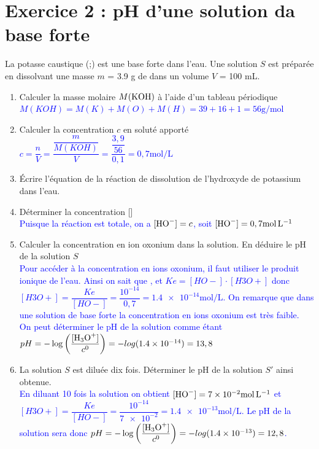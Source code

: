 \documentclass[a4paper,12pt]{article}
\begin{document}
\section*{Exercice 2 : pH d'une solution da base forte}
La potasse caustique (;) est une base forte dans l'eau. Une solution $S$ est préparée en dissolvant une masse $m$ = \num{3,9} \unit{\gram} de  dans un volume $V$ = \num{100} \unit{\milli \liter}.
\begin{enumerate}
	\item Calculer la masse molaire $M(\ce{KOH})$ à l'aide d'un tableau périodique\\
	\textcolor{blue}{$M(KOH) = M(K)+M(O)+M(H)=39+16+1=56\unit{\gram\per\mole}$}
	\item Calculer la concentration $c$ en soluté apporté\\
	\textcolor{blue}{$c=\dfrac{n}{V} = \dfrac{\dfrac{m}{M(KOH)}}{V} = \dfrac{\dfrac{3,9}{56}}{0,1} =0,7\unit{\mole\per\liter}$}
	\item Écrire l'équation de la réaction de dissolution de l'hydroxyde de potassium  dans l'eau.\\
	\textcolor{blue}{}
	\item Déterminer la concentration []\\
	\textcolor{blue}{Puisque la réaction est totale, on a $[\ce{HO-}]=c$, soit $[\ce{HO-}]=0,7\unit{\mole\per\liter}$}
	\item Calculer la concentration en ion oxonium dans la solution. En déduire le pH de la solution $S$\\
	\textcolor{blue}{Pour accéder à la concentration en ions oxonium, il faut utiliser le produit ionique de l'eau. Ainsi on sait que , et $Ke =[HO-]\cdot [H3O+]$ donc $[H3O+] = \dfrac{Ke}{[HO-]} = \dfrac{10^{-14}}{0,7}=\num{1,4e-14}\unit{\mole\per\liter}$. On remarque que dans une solution de base forte la concentration en ions oxonium est très faible.}\\
	\textcolor{blue}{On peut déterminer le pH de la solution comme étant $pH=-\log\left(\dfrac{[\ce{H3O+}]}{c^0}\right) = -log(\num{1,4e-14})=13,8$}
	\item La solution $S$ est diluée dix fois. Déterminer le pH de la solution $S'$ ainsi obtenue.\\
	\textcolor{blue}{En diluant 10 fois la solution on obtient $[\ce{HO-}]=\num{7e-2}\unit{\mole\per\liter}$ et $[H3O+] = \dfrac{Ke}{[HO-]} = \dfrac{10^{-14}}{\num{7e-2}}=\num{1,4e-13}\unit{\mole\per\liter}$. Le pH de la solution sera donc $pH=-\log\left(\dfrac{[\ce{H3O+}]}{c^0}\right) = -log(\num{1,4e-13})=12,8$.}
\end{enumerate}
\end{document}
